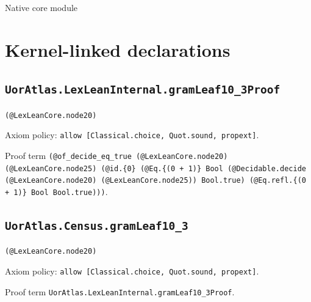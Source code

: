 \documentclass[11pt]{article}
\begin{document}
\begin{center}{\LARGE Native core module}\end{center}
\section*{Kernel-linked declarations}
\subsection*{\texttt{UorAtlas.LexLeanInternal.gramLeaf10\_3Proof}}
\noindent\texttt{(@LexLeanCore.node20)}\par
\noindent Axiom policy: \texttt{allow [Classical.choice, Quot.sound, propext]}.\par
\noindent Proof term \texttt{(@of\_decide\_eq\_true (@LexLeanCore.node20) (@LexLeanCore.node25) (@id.\{0\} (@Eq.\{(0 + 1)\} Bool (@Decidable.decide (@LexLeanCore.node20) (@LexLeanCore.node25)) Bool.true) (@Eq.refl.\{(0 + 1)\} Bool Bool.true)))}.\par
\subsection*{\texttt{UorAtlas.Census.gramLeaf10\_3}}
\noindent\texttt{(@LexLeanCore.node20)}\par
\noindent Axiom policy: \texttt{allow [Classical.choice, Quot.sound, propext]}.\par
\noindent Proof term \texttt{UorAtlas.LexLeanInternal.gramLeaf10\_3Proof}.\par
\end{document}
